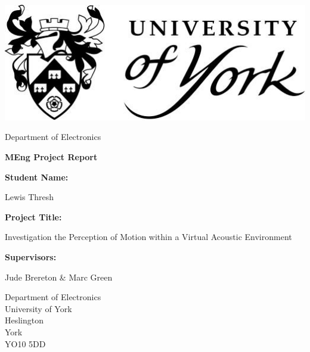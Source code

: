 \begin{titlepage}
	\begin{center}
		
		\includegraphics[scale = 0.3]{Presections/FrontCover/title.png}
		
		\vspace{1cm}
		\huge
		Department of Electronics
		
		
		\vspace{0.5cm}
		\huge
		\textbf{MEng Project Report}
	\end{center}
		
	\vspace{2cm}
		
		
	\large
	\noindent\textbf{Student Name:} \begin{center}Lewis Thresh \end{center}
	
	\vspace{0cm}
	\noindent\textbf{Project Title:} \begin{center} Investigation the Perception of Motion within a Virtual Acoustic Environment\end{center}
	
	\vspace{0cm}
	\noindent\textbf{Supervisors:} \begin{center}Jude Brereton \& Marc Green \end{center}

	\vspace{2.5cm}
		
	\begin{center}
		\small
		Department of Electronics\\University of York\\Heslington\\York\\YO10 5DD
	\end{center}
		
	
\end{titlepage}